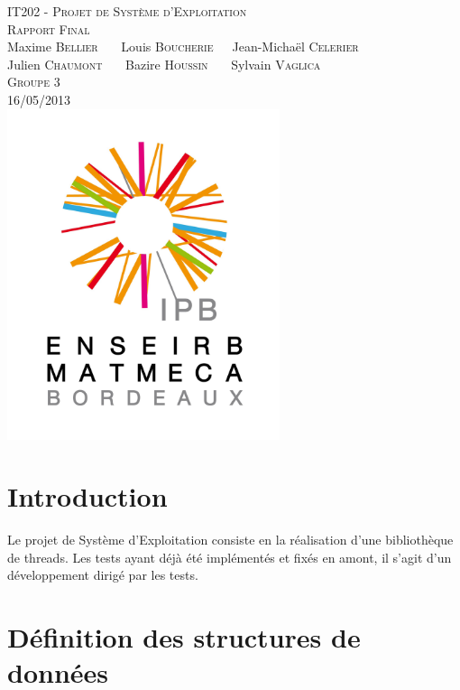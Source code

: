\documentclass[a4paper,11pt]{article}
\begin{document}
\begin{titlepage}
  \begin{center}

    \textsc{IT202 - Projet de Système d'Exploitation}\\[2cm]
    \textsc{\large Rapport Final}\\[3cm]
    Maxime \textsc{Bellier} \ \ \ Louis \textsc{Boucherie}\ \ \ Jean-Michaël \textsc{Celerier}\\
    Julien \textsc{Chaumont} \ \ \ Bazire \textsc{Houssin} \ \ \ Sylvain \textsc{Vaglica}\\[1cm]
    \textsc{Groupe 3}\\[1.5cm]
    \textsc{\large 16/05/2013 }\\[1.5cm]
    \includegraphics[width=8cm]{logo.png}

  \end{center}
  \vspace{3cm}

\end{titlepage}

\clearpage

\section*{Introduction}

Le projet de Système d'Exploitation consiste en la réalisation d'une bibliothèque de threads. Les tests ayant déjà été implémentés et fixés en amont, il s'agit d'un développement dirigé par les tests.



\section{Définition des structures de données}
\end{document}
